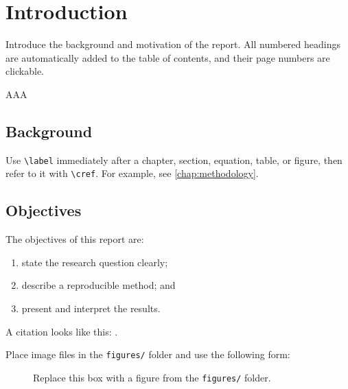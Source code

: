 \chapter{Introduction}
\label{chap:introduction}

Introduce the background and motivation of the report. All numbered headings
are automatically added to the table of contents, and their page numbers are
clickable.

AAA

\section{Background}
\label{sec:background}

Use \verb|\label| immediately after a chapter, section, equation, table, or
figure, then refer to it with \verb|\cref|. For example, see
\cref{chap:methodology}.

\section{Objectives}

The objectives of this report are:

\begin{enumerate}[label=\arabic*.]
  \item state the research question clearly;
  \item describe a reproducible method; and
  \item present and interpret the results.
\end{enumerate}

A citation looks like this: \citep{lamport1994latex}.

Place image files in the \texttt{figures/} folder and use the following form:

\begin{figure}[htbp]
  \centering
  \fbox{\rule{0pt}{45mm}\rule{0.72\textwidth}{0pt}}
  \caption{Replace this box with a figure from the \texttt{figures/} folder.}
  \label{fig:placeholder}
\end{figure}